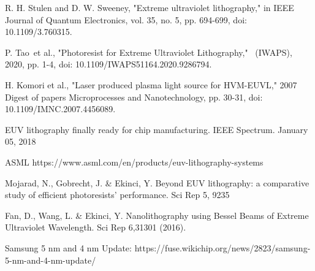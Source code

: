 \documentclass[12pt,a4paper]{report}
\begin{document}
\begin{thebibliography}{99}

R. H. Stulen and D. W. Sweeney, "Extreme ultraviolet lithography," in IEEE Journal of Quantum Electronics, 
      vol. 35, no. 5, pp. 694-699, doi: 10.1109/3.760315.

P. Tao et al., "Photoresist for Extreme Ultraviolet Lithography,"  (IWAPS), 2020, pp. 1-4, 
     doi: 10.1109/IWAPS51164.2020.9286794.

H. Komori et al., "Laser produced plasma light source for HVM-EUVL," 2007 Digest of papers 
     Microprocesses and Nanotechnology, pp. 30-31, doi: 10.1109/IMNC.2007.4456089.

EUV lithography finally ready for chip manufacturing. IEEE Spectrum. January 05, 2018

ASML https://www.asml.com/en/products/euv-lithography-systems      

Mojarad, N., Gobrecht, J. \& Ekinci, Y. Beyond EUV lithography: a comparative study of efficient photoresists' performance. Sci Rep 5, 9235

Fan, D., Wang, L. \& Ekinci, Y. Nanolithography using Bessel Beams of Extreme Ultraviolet Wavelength. Sci Rep 6,31301 (2016).

Samsung 5 nm and 4 nm Update: https://fuse.wikichip.org/news/2823/samsung-5-nm-and-4-nm-update/


\end{thebibliography}
\end{document}
